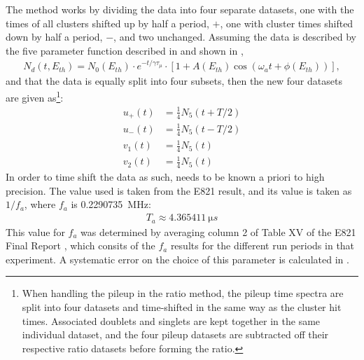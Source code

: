 The method works by dividing the data into four separate datasets, one with the times of all clusters shifted up by half a \gmtwo period, $+$\Tatwo, one with cluster times shifted down by half a \gmtwo period, $-$\Tatwo, and two unchanged. Assuming the data is described by the five parameter function described in  and shown in , %
        \begin{align} \label{eq:5parfuncrepeated}
            N_{d}(t, E_{th}) = N_{0}(E_{th}) \cdot e^{-t/\gamma\tau_{\mu}} \cdot [1 + A(E_{th}) \cos(\omega_{a}t+\phi(E_{th}))],
        \end{align}
and that the data is equally split into four subsets, then the new four datasets are given as\footnote{When handling the pileup in the ratio method, the pileup time spectra are split into four datasets and time-shifted in the same way as the cluster hit times. Associated doublets and singlets are kept together in the same individual dataset, and the four pileup datasets are subtracted off their respective ratio datasets before forming the ratio.}:
    \begin{equation}
    \begin{aligned}
        u_{+}(t) &= \frac{1}{4} N_{5}(t+T/2) \\
        u_{-}(t) &= \frac{1}{4} N_{5}(t-T/2) \\
        v_{1}(t) &= \frac{1}{4} N_{5}(t) \\
        v_{2}(t) &= \frac{1}{4} N_{5}(t)
    \end{aligned}
    \end{equation}
In order to time shift the data as such, \Ta needs to be known a priori to high precision. The value used is taken from the E821 result, and its value is taken as $1/f_{a}$, where $f_{a}$ is \SI{0.2290735}{MHz}:
        \begin{align}
            T_{a} \approx \SI{4.365411}{\micro s}
        \label{eq:Ta}
        \end{align}
This value for $f_{a}$ was determined by averaging column 2 of Table XV of the E821 Final Report \cite{E821FinalReport}, which consits of the $f_{a}$ results for the different run periods in that experiment. A systematic error on the choice of this parameter is calculated in .


